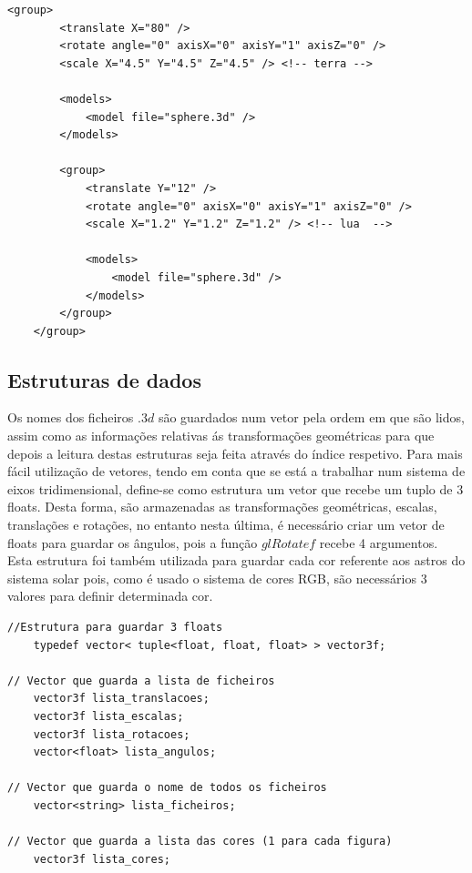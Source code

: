 \documentclass{report}
\begin{document}
\begin{lstlisting}[caption={Excerto do ficheiro solar.xml},captionpos=b]
    <group>
        <translate X="80" /> 
        <rotate angle="0" axisX="0" axisY="1" axisZ="0" />
        <scale X="4.5" Y="4.5" Z="4.5" /> <!-- terra -->

        <models>
            <model file="sphere.3d" />
        </models>

        <group>
            <translate Y="12" /> 
            <rotate angle="0" axisX="0" axisY="1" axisZ="0" />
            <scale X="1.2" Y="1.2" Z="1.2" /> <!-- lua  -->

            <models>
                <model file="sphere.3d" />
            </models>
        </group>
    </group>
\end{lstlisting}

\subsection{Estruturas de dados}
Os nomes dos ficheiros $.3d$ s\~ao guardados num vetor pela ordem em que s\~ao lidos, assim como as informa\c{c}\~oes relativas \'as transforma\c{c}\~oes geom\'etricas para que depois a leitura destas estruturas seja feita atrav\'es do \'indice respetivo.
Para mais f\'acil utiliza\c{c}\~ao de vetores, tendo em conta que se est\'a a trabalhar num sistema de eixos tridimensional, define-se como estrutura um vetor que recebe um tuplo de 3 floats. Desta forma, s\~ao armazenadas as transforma\c{c}\~oes geom\'etricas, escalas, transla\c{c}\~oes e rota\c{c}\~oes, no entanto nesta \'ultima, \'e necess\'ario criar um vetor de floats para guardar os \^angulos, pois a fun\c{c}\~ao $glRotatef$ recebe 4 argumentos. 
Esta estrutura foi tamb\'em utilizada para guardar cada cor referente aos astros do sistema solar pois, como \'e usado o sistema de cores RGB, s\~ao necess\'arios 3 valores para definir determinada cor.
\\

\begin{lstlisting}[caption={Estruturas de dados},captionpos=b]
//Estrutura para guardar 3 floats
    typedef vector< tuple<float, float, float> > vector3f;

// Vector que guarda a lista de ficheiros
    vector3f lista_translacoes;
    vector3f lista_escalas;
    vector3f lista_rotacoes;
    vector<float> lista_angulos;

// Vector que guarda o nome de todos os ficheiros
    vector<string> lista_ficheiros;

// Vector que guarda a lista das cores (1 para cada figura)
    vector3f lista_cores; 

\end{lstlisting}
\end{document}
